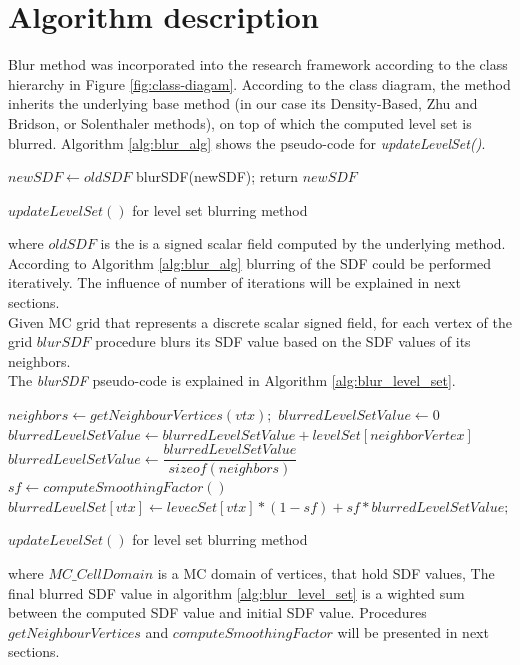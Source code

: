 \section{Algorithm description}
Blur method was incorporated into the research framework according to the class hierarchy in Figure \ref{fig:class-diagam}. According to the class diagram, the method inherits the underlying base method (in our case its Density-Based, Zhu and Bridson, or Solenthaler methods), on top of which the computed level set is blurred.  Algorithm \ref{alg:blur_alg} shows the pseudo-code for \emph{updateLevelSet()}.
\begin{algorithm}[H]
	\scriptsize
	\begin{algorithmic}
		\State $newSDF \gets  oldSDF$
			\State blurSDF(newSDF);
		\EndFor
		\State return $newSDF$
	\end{algorithmic}
	\caption{$updateLevelSet()$ for level set blurring method}
	\label{alg:blur_alg}
\end{algorithm}
where $oldSDF$ is the is a signed scalar field computed by the underlying method.\\
According to Algorithm \ref{alg:blur_alg} blurring of the SDF could be performed iteratively. The influence of number of iterations will be explained in next sections.\\
Given MC grid that represents a discrete scalar signed field, for each vertex of the grid $blurSDF$ procedure blurs its SDF value based on the SDF values of its neighbors.\\
The \emph{blurSDF} pseudo-code is explained in Algorithm \ref{alg:blur_level_set}.
\begin{algorithm}[H]
	\scriptsize
	\begin{algorithmic}
		\ForAll{$vtx \in MC\_CellDomain$}
			\State $neighbors \gets getNeighbourVertices(vtx);$
			\State $blurredLevelSetValue \gets 0$
			\ForAll{$nbVtx \in neighbors$}
				\State $blurredLevelSetValue\gets blurredLevelSetValue + levelSet[neighborVertex]$
			\EndFor
			\State $blurredLevelSetValue\gets\dfrac{blurredLevelSetValue}{sizeof(neighbors)}$
			\State $sf\gets computeSmoothingFactor()$
			\State $blurredLevelSet[vtx]\gets levecSet[vtx] * (1 - sf) + sf * blurredLevelSetValue;$
		\EndFor
	\end{algorithmic}
	\caption{$updateLevelSet()$ for level set blurring method}
	\label{alg:blur_level_set}
\end{algorithm}
where $MC\_CellDomain$ is a MC domain of vertices, that hold SDF values, 
The final blurred SDF value in algorithm \ref{alg:blur_level_set} is a wighted sum between the computed SDF value and initial SDF value. Procedures $getNeighbourVertices$ and $computeSmoothingFactor$ will be presented in next sections.
